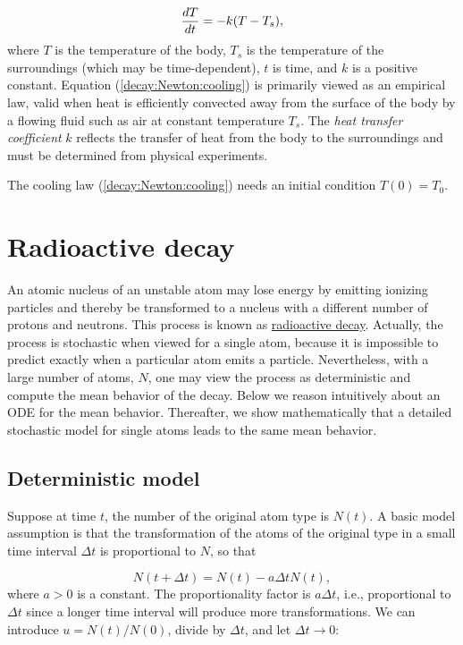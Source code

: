 \documentclass[%
oneside,                 %
final,                   %
10pt]{article}
\begin{document}
\begin{equation}
{dT\over dt} = -k(T-T_s),
\label{decay:Newton:cooling}
\end{equation}
where $T$ is the temperature of the body, $T_s$ is the temperature
of the surroundings (which may be time-dependent),
$t$ is time, and $k$ is a positive constant.
Equation (\ref{decay:Newton:cooling}) is primarily viewed as an
empirical law, valid when heat is efficiently convected away
from the surface of the body by a flowing fluid such as air
at constant temperature $T_s$.
The \emph{heat transfer coefficient} $k$ reflects the transfer of
heat from the body to
the surroundings and must be determined from physical experiments.

The cooling law (\ref{decay:Newton:cooling}) needs an initial
condition $T(0)=T_0$.


\section{Radioactive decay}
\label{decay:app:nuclear}


An atomic nucleus of an unstable atom may lose energy by emitting
ionizing particles and thereby be transformed to a nucleus with a
different number of protons and neutrons.  This process is known as
\href{{http://en.wikipedia.org/wiki/Radioactive_decay}}{radioactive decay}.
Actually, the process is stochastic when viewed for a single atom,
because it is impossible to predict exactly when a particular atom
emits a particle. Nevertheless, with a large number of atoms, $N$, one
may view the process as deterministic and compute the mean behavior of
the decay. Below we reason intuitively about an ODE for the mean
behavior. Thereafter, we show mathematically that a detailed stochastic model
for single atoms leads to the same mean behavior.

\subsection{Deterministic model}

Suppose at time $t$, the number of the original atom type is $N(t)$.
A basic model assumption is that the transformation of the atoms of the original
type in a small time interval $\Delta t$ is proportional to
$N$, so that

\[ N(t+\Delta t) = N(t) - a\Delta t N(t),\]
where $a>0$ is a constant. The proportionality factor is $a\Delta t$, i.e.,
proportional to $\Delta t$ since a longer time interval will produce more
transformations.
We can introduce $u=N(t)/N(0)$, divide by
$\Delta t$, and let $\Delta t\rightarrow 0$:
\end{document}
